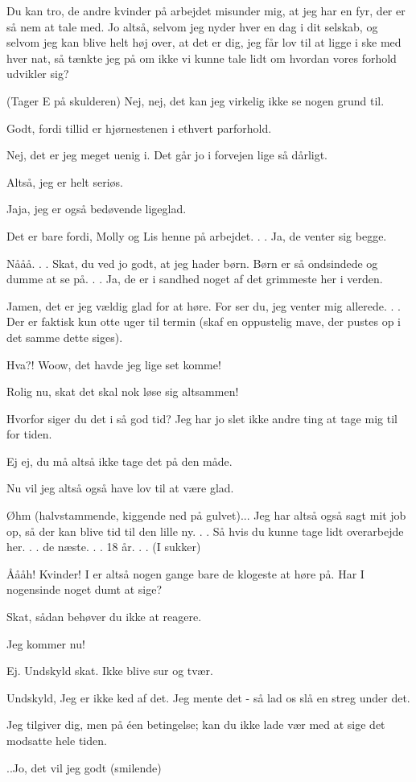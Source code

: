 \documentclass[a4paper,11pt]{article}
\begin{document}
\begin{sketch}
 Du kan tro, de andre kvinder på arbejdet misunder mig, at jeg har en fyr, der er så nem at tale med. Jo altså, selvom jeg nyder hver en dag i dit selskab, og selvom jeg kan blive helt høj over, at det er dig, jeg får lov til at ligge i ske med hver nat, så tænkte jeg på om ikke vi kunne tale lidt om hvordan vores forhold udvikler sig?

 (Tager E på skulderen) Nej, nej, det kan jeg virkelig ikke se nogen grund til.

 Godt, fordi tillid er hjørnestenen i ethvert parforhold.

 Nej, det er jeg meget uenig i. Det går jo i forvejen lige så dårligt.

 Altså, jeg er helt seriøs.

 Jaja, jeg er også bedøvende ligeglad.

 Det er bare fordi, Molly og Lis henne på arbejdet. . . Ja, de venter sig begge.

 Nååå. . . Skat, du ved jo godt, at jeg hader børn. Børn er så ondsindede og dumme at se på. . . Ja, de er i sandhed noget af det grimmeste her i verden.

 Jamen, det er jeg vældig glad for at høre. For ser du, jeg venter mig allerede. . . Der er faktisk kun otte uger til termin (skaf en oppustelig
mave, der pustes op i det samme dette siges).

 Hva?! Woow, det havde jeg lige set komme!

 Rolig nu, skat det skal nok løse sig altsammen!

 Hvorfor siger du det i så god tid? Jeg har jo slet ikke andre ting at tage mig til for tiden.

 Ej ej, du må altså ikke tage det på den måde.

 Nu vil jeg altså også have lov til at være glad.

 Øhm (halvstammende, kiggende ned på gulvet)... Jeg har altså også sagt mit job op, så der kan blive tid til den lille ny. . . Så hvis du kunne tage lidt overarbejde her. . . de næste. . . 18 år. . . (I sukker)

 Åååh! Kvinder! I er altså nogen gange bare de klogeste at høre på. Har I nogensinde noget dumt at sige?

 Skat, sådan behøver du ikke at reagere.

  Jeg kommer nu!


 Ej. Undskyld skat. Ikke blive sur og tvær.


  Undskyld, Jeg er ikke ked af det. Jeg mente det - så lad os slå en streg under det.

  Jeg tilgiver dig, men på éen betingelse; kan du ikke lade vær med at sige det modsatte hele tiden.

  ..Jo, det vil jeg godt (smilende)

\end{sketch}
\end{document}
